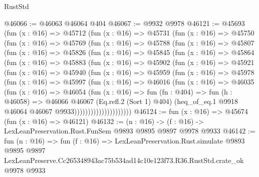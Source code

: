 \begin{lexlean}{RustStd}
\begin{coremodule}
@46066 := @46063 @46064 @404
@46067 := @9932 @9978
@46121 := @45693
    (fun (x : @16) =>
    @45712
      (fun (x : @16) =>
      @45731
        (fun (x : @16) =>
        @45750
          (fun (x : @16) =>
          @45769
            (fun (x : @16) =>
            @45788
              (fun (x : @16) =>
              @45807
                (fun (x : @16) =>
                @45826
                  (fun (x : @16) =>
                  @45845
                    (fun (x : @16) =>
                    @45864
                      (fun (x : @16) =>
                      @45883
                        (fun (x : @16) =>
                        @45902
                          (fun (x : @16) =>
                          @45921
                            (fun (x : @16) =>
                            @45940
                              (fun (x : @16) =>
                              @45959
                                (fun (x : @16) =>
                                @45978
                                  (fun (x : @16) =>
                                  @45997
                                    (fun (x : @16) =>
                                    @46016
                                      (fun (x : @16) =>
                                      @46035
                                        (fun (x : @16) =>
                                        @46054
                                          (fun (x : @16) =>
                                          fun (fn : @404) =>
                                          fun (h : @46058) =>
                                          @46066
                                            @46067
                                            (Eq.refl.{2} (Sort 1) @404)
                                            (heq_of_eq.{1}
                                              @9918
                                              @46064
                                              @46067
                                              @9933)))))))))))))))))))))
@46124 := fun (x : @16) => @45674 (fun (x : @16) => @46121)
@46132 := (n : @16) -> (f : @16) -> LexLeanPreservation.Rust.FunSem @9893 @9895 @9897 @9978 @9933
@46142 := fun (n : @16) =>
  fun (f : @16) =>
  LexLeanPreservation.Rust.simulate
    @9893
    @9895
    @9897
    LexLeanPreserve.Cc265348943ac75b534ad14c10e123f73.R36.RustStd.crate_ok
    @9978
    @9933
\end{coremodule}
\end{lexlean}
